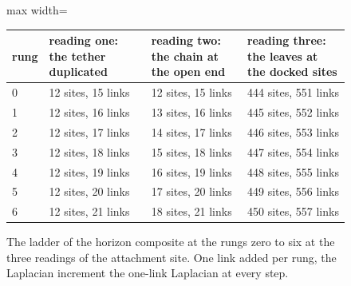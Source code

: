 \begin{figure}[h]
\centering
\begin{adjustbox}{max width=\linewidth}\begin{tabular}{llll}
\hline
rung & reading one: the tether duplicated & reading two: the chain at the open end & reading three: the leaves at the docked sites \\
\hline
0 & 12 sites, 15 links & 12 sites, 15 links & 444 sites, 551 links \\
1 & 12 sites, 16 links & 13 sites, 16 links & 445 sites, 552 links \\
2 & 12 sites, 17 links & 14 sites, 17 links & 446 sites, 553 links \\
3 & 12 sites, 18 links & 15 sites, 18 links & 447 sites, 554 links \\
4 & 12 sites, 19 links & 16 sites, 19 links & 448 sites, 555 links \\
5 & 12 sites, 20 links & 17 sites, 20 links & 449 sites, 556 links \\
6 & 12 sites, 21 links & 18 sites, 21 links & 450 sites, 557 links \\
\hline
\end{tabular}\end{adjustbox}
\caption{The ladder of the horizon composite at the rungs zero to six at the three readings of the attachment site. One link added per rung, the Laplacian increment the one-link Laplacian at every step.}
\end{figure}
